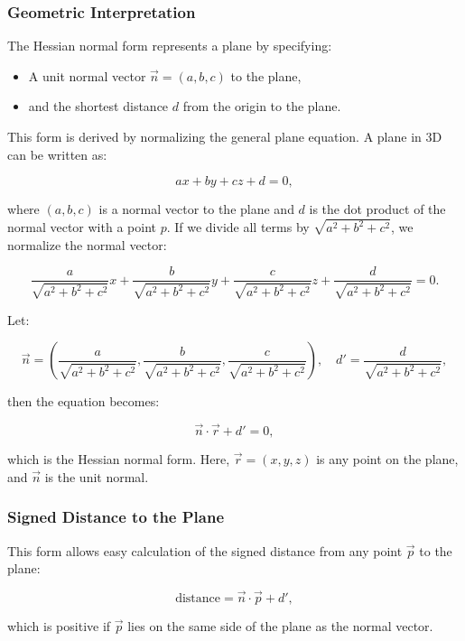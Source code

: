 \subsubsection{Geometric Interpretation}

The Hessian normal form represents a plane by specifying:

\begin{itemize}
	
	\item A unit normal vector \(\vec{n} = (a, b, c)\) to the plane,

	\item and the shortest distance \(d\) from the origin to the plane.

\end{itemize}

This form is derived by normalizing the general plane equation. A plane in 3D can be written as:

\[
	ax + by + cz + d = 0,
\]

where \((a, b, c)\) is a normal vector to the plane and \(d\) is the dot product of the normal vector with a point \(p\).
If we divide all terms by \(\sqrt{a^2 + b^2 + c^2}\), we normalize the normal vector:

\[
	\frac{a}{\sqrt{a^2 + b^2 + c^2}}x + \frac{b}{\sqrt{a^2 + b^2 + c^2}}y + \frac{c}{\sqrt{a^2 + b^2 + c^2}}z + \frac{d}{\sqrt{a^2 + b^2 + c^2}} = 0.
\]

Let:

\[
	\vec{n} = \left(\frac{a}{\sqrt{a^2 + b^2 + c^2}}, \frac{b}{\sqrt{a^2 + b^2 + c^2}}, \frac{c}{\sqrt{a^2 + b^2 + c^2}}\right), \quad d' = \frac{d}{\sqrt{a^2 + b^2 + c^2}},
\]

then the equation becomes:

\[
	\vec{n} \cdot \vec{r} + d' = 0,
\]

which is the Hessian normal form. Here, \(\vec{r} = (x, y, z)\) is any point on the plane, and \(\vec{n}\) is the unit normal.

\subsubsection{Signed Distance to the Plane}

This form allows easy calculation of the signed distance from any point \(\vec{p}\) to the plane:

\[
	\text{distance} = \vec{n} \cdot \vec{p} + d',
\]

which is positive if \(\vec{p}\) lies on the same side of the plane as the normal vector.

